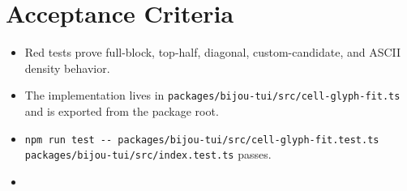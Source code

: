 \section{Acceptance Criteria}\label{record-160-acceptance-criteria}

\begin{itemize}
\tightlist
\item
  Red tests prove full-block, top-half, diagonal, custom-candidate, and ASCII density behavior.
\item
  The implementation lives in \texttt{p\allowbreak{}a\allowbreak{}c\allowbreak{}k\allowbreak{}a\allowbreak{}g\allowbreak{}e\allowbreak{}s\allowbreak{}/\allowbreak{}b\allowbreak{}i\allowbreak{}j\allowbreak{}o\allowbreak{}u\allowbreak{}-\allowbreak{}t\allowbreak{}u\allowbreak{}i\allowbreak{}/\allowbreak{}s\allowbreak{}r\allowbreak{}c\allowbreak{}/\allowbreak{}c\allowbreak{}e\allowbreak{}l\allowbreak{}l\allowbreak{}-\allowbreak{}g\allowbreak{}l\allowbreak{}y\allowbreak{}p\allowbreak{}h\allowbreak{}-\allowbreak{}f\allowbreak{}i\allowbreak{}t\allowbreak{}.\allowbreak{}t\allowbreak{}s} and is exported from the package root.
\item
  \texttt{n\allowbreak{}p\allowbreak{}m\allowbreak{} \allowbreak{}r\allowbreak{}u\allowbreak{}n\allowbreak{} \allowbreak{}t\allowbreak{}e\allowbreak{}s\allowbreak{}t\allowbreak{} \allowbreak{}-\allowbreak{}-\allowbreak{} \allowbreak{}p\allowbreak{}a\allowbreak{}c\allowbreak{}k\allowbreak{}a\allowbreak{}g\allowbreak{}e\allowbreak{}s\allowbreak{}/\allowbreak{}b\allowbreak{}i\allowbreak{}j\allowbreak{}o\allowbreak{}u\allowbreak{}-\allowbreak{}t\allowbreak{}u\allowbreak{}i\allowbreak{}/\allowbreak{}s\allowbreak{}r\allowbreak{}c\allowbreak{}/\allowbreak{}c\allowbreak{}e\allowbreak{}l\allowbreak{}l\allowbreak{}-\allowbreak{}g\allowbreak{}l\allowbreak{}y\allowbreak{}p\allowbreak{}h\allowbreak{}-\allowbreak{}f\allowbreak{}i\allowbreak{}t\allowbreak{}.\allowbreak{}t\allowbreak{}e\allowbreak{}s\allowbreak{}t\allowbreak{}.\allowbreak{}t\allowbreak{}s\allowbreak{} \allowbreak{}p\allowbreak{}a\allowbreak{}c\allowbreak{}k\allowbreak{}a\allowbreak{}g\allowbreak{}e\allowbreak{}s\allowbreak{}/\allowbreak{}b\allowbreak{}i\allowbreak{}j\allowbreak{}o\allowbreak{}u\allowbreak{}-\allowbreak{}t\allowbreak{}u\allowbreak{}i\allowbreak{}/\allowbreak{}s\allowbreak{}r\allowbreak{}c\allowbreak{}/\allowbreak{}i\allowbreak{}n\allowbreak{}d\allowbreak{}e\allowbreak{}x\allowbreak{}.\allowbreak{}t\allowbreak{}e\allowbreak{}s\allowbreak{}t\allowbreak{}.\allowbreak{}t\allowbreak{}s} passes.
\item

\end{itemize}
